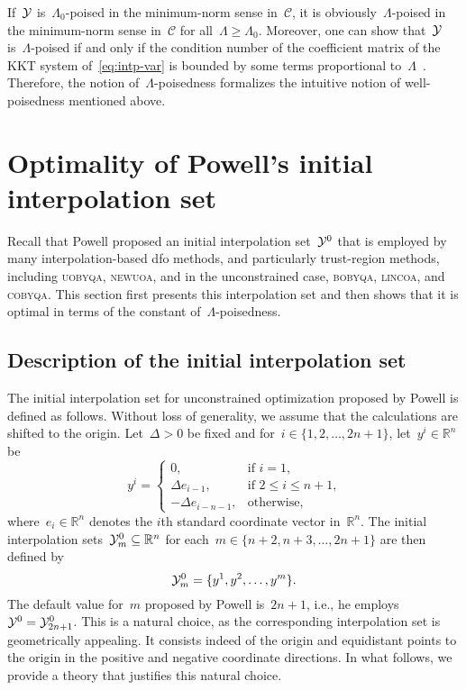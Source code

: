 \documentclass{article}
\numberwithin{equation}{section}
\theoremstyle{definition}
\theoremstyle{plain}
\theoremstyle{remark}
\newcommand*{\R}{\mathbb{R}}
\newcommand*{\set}[2][]{#1\{#2#1\}}
\newcommand*{\solvername}[1]{\textsc{#1}\xspace}
\newcommand*{\xpt}[1][]{\mathcal{Y}\ifblank{#1}{}{^{#1}}}
\begin{document}
If~$\xpt$ is~$\Lambda_0$-poised in the minimum-norm sense in~$\mathcal{C}$, it is obviously~$\Lambda$-poised in the minimum-norm sense in~$\mathcal{C}$ for all~$\Lambda \ge \Lambda_0$.
Moreover, one can show that~$\xpt$ is~$\Lambda$-poised if and only if the condition number of the coefficient matrix of the KKT system of~\eqref{eq:intp-var} is bounded by some terms proportional to~$\Lambda$~\cite[Theorem~5.8]{Conn_Scheinberg_Vicente_2009}.
Therefore, the notion of~$\Lambda$-poisedness formalizes the intuitive notion of well-poisedness mentioned above.

\section{Optimality of Powell's initial interpolation set}
\label{sec:main-result}

Recall that Powell proposed an initial interpolation set~$\xpt[0]$ that is employed by many interpolation-based \gls{dfo} methods, and particularly trust-region methods, including \solvername{uobyqa}, \solvername{newuoa}, and in the unconstrained case, \solvername{bobyqa}, \solvername{lincoa}, and \solvername{cobyqa}.
This section first presents this interpolation set and then shows that it is optimal in terms of the constant of~$\Lambda$-poisedness.

\subsection{Description of the initial interpolation set}

The initial interpolation set for unconstrained optimization proposed by Powell is defined as follows.
Without loss of generality, we assume that the calculations are shifted to the origin.
Let~$\Delta > 0$ be fixed and for~$i \in \set{1, 2, \dots, 2n + 1}$, let~$y^i \in \R^n$ be
\begin{equation}
    \label{eq:set-def}
    y^i =
    \begin{cases}
        0,                      & \text{if~$i = 1$,}\\
        \Delta e_{i - 1},       & \text{if~$2 \le i \le n + 1$,}\\
        -\Delta e_{i - n - 1},  & \text{otherwise},
    \end{cases}
\end{equation}
where~$e_i \in \R^n$ denotes the $i$th standard coordinate vector in~$\R^n$.
The initial interpolation sets~$\xpt[0]_m \subseteq \R^n$ for each~$m \in \set{n + 2, n + 3, \dots, 2n + 1}$ are then defined by
\begin{equation}
    \label{eq:set-def-m}
    \xpt[0]_m = \set{y^1, y^2, \dots, y^m}.
\end{equation}
The default value for~$m$ proposed by Powell is~$2n + 1$, i.e., he employs~$\xpt[0] = \xpt[0]_{2n + 1}$.
This is a natural choice, as the corresponding interpolation set is geometrically appealing.
It consists indeed of the origin and equidistant points to the origin in the positive and negative coordinate directions.
In what follows, we provide a theory that justifies this natural choice.
\end{document}
